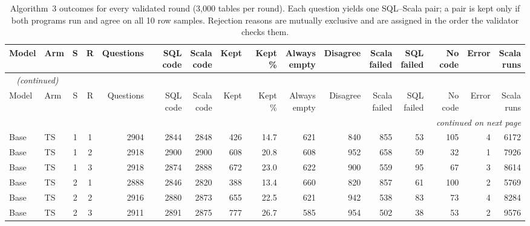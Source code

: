 \begin{landscape}
{\footnotesize
{}
\setlength{\tabcolsep}{4.2pt}
\begin{longtable}{@{}llccrrrrrrrrrrrr@{}}
\caption{Algorithm~3 outcomes for every validated round (3,000 tables per round). Each question yields one SQL--Scala pair; a pair is kept only if both programs run and agree on all 10 row samples. Rejection reasons are mutually exclusive and are assigned in the order the validator checks them.}\label{tab:gen-validation}\\
\toprule
\rowcolor{headshade}Model & Arm & S & R & Questions & SQL code & \makecell{Scala\\code} & Kept & Kept \% & \makecell{Always\\empty} & Disagree & \makecell{Scala\\failed} & \makecell{SQL\\failed} & No code & Error & \makecell{Scala\\runs}\\
\midrule
\endfirsthead
\multicolumn{16}{l}{\textit{\tablename~\thetable{} (continued)}}\\
\toprule
\rowcolor{headshade}Model & Arm & S & R & Questions & SQL code & \makecell{Scala\\code} & Kept & Kept \% & \makecell{Always\\empty} & Disagree & \makecell{Scala\\failed} & \makecell{SQL\\failed} & No code & Error & \makecell{Scala\\runs}\\
\midrule
\endhead
\midrule
\multicolumn{16}{r}{\textit{continued on next page}}\\
\endfoot
\bottomrule
\endlastfoot
Base & TS & 1 & 1 & 2904 & 2844 & 2848 & 426 & 14.7 & 621 & 840 & 855 & 53 & 105 & 4 & 6172\\
Base & TS & 1 & 2 & 2918 & 2900 & 2900 & 608 & 20.8 & 608 & 952 & 658 & 59 & 32 & 1 & 7926\\
Base & TS & 1 & 3 & 2918 & 2874 & 2888 & 672 & 23.0 & 622 & 900 & 559 & 95 & 67 & 3 & 8614\\
Base & TS & 2 & 1 & 2888 & 2846 & 2820 & 388 & 13.4 & 660 & 820 & 857 & 61 & 100 & 2 & 5769\\
Base & TS & 2 & 2 & 2916 & 2880 & 2873 & 655 & 22.5 & 621 & 942 & 538 & 83 & 73 & 4 & 8284\\
Base & TS & 2 & 3 & 2911 & 2891 & 2875 & 777 & 26.7 & 585 & 954 & 502 & 38 & 53 & 2 & 9576\\

\end{longtable}}
\end{landscape}
